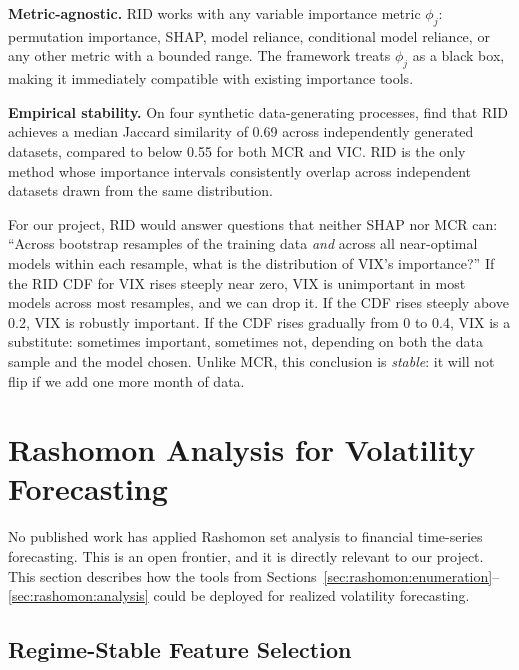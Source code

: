 \textbf{Metric-agnostic.}  RID works with any variable importance metric
$\phi_j$: permutation importance, SHAP, model reliance, conditional
model reliance, or any other metric with a bounded range.  The framework
treats $\phi_j$ as a black box, making it immediately compatible with
existing importance tools.

\textbf{Empirical stability.}  On four synthetic data-generating
processes, \citet{DonnellyEtAl2023} find that RID achieves a median
Jaccard similarity of 0.69 across independently generated datasets,
compared to below 0.55 for both MCR and VIC.  RID is the only method
whose importance intervals consistently overlap across independent
datasets drawn from the same distribution.

\begin{projectconnection}
For our project, RID would answer questions that neither SHAP nor MCR can:
``Across bootstrap resamples of the training data \emph{and} across all
near-optimal models within each resample, what is the distribution of
VIX's importance?''  If the RID CDF for VIX rises steeply near zero, VIX
is unimportant in most models across most resamples, and we can drop it.
If the CDF rises steeply above 0.2, VIX is robustly important.  If the
CDF rises gradually from 0 to 0.4, VIX is a substitute: sometimes
important, sometimes not, depending on both the data sample and the model
chosen.  Unlike MCR, this conclusion is \emph{stable}: it will not
flip if we add one more month of data.
\end{projectconnection}


\section{Rashomon Analysis for Volatility Forecasting}
\label{sec:rashomon:vol}

No published work has applied Rashomon set analysis to financial time-series
forecasting.  This is an open frontier, and it is directly relevant to our
project.  This section describes how the tools from
Sections~\ref{sec:rashomon:enumeration}--\ref{sec:rashomon:analysis} could be
deployed for realized volatility forecasting.

\subsection{Regime-Stable Feature Selection}

